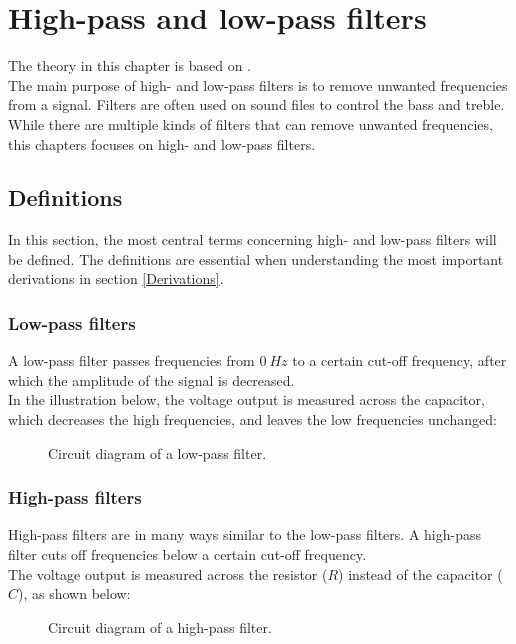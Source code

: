 \chapter{High-pass and low-pass filters} \label{chap:high_low}
The theory in this chapter is based on \cite{bcircuit}\cite{bcircuit5}.\\
The main purpose of high- and low-pass filters is to remove unwanted frequencies from a signal. Filters are often used on sound files to control the bass and treble. While there are multiple kinds of filters that can remove unwanted frequencies, this chapters focuses on high- and low-pass filters.

\section{Definitions}
In this section, the most central terms concerning high- and low-pass filters will be defined. The definitions are essential when understanding the most important derivations in section \ref{Derivations}.

\subsection{Low-pass filters}
A low-pass filter passes frequencies from  $0~Hz$ to a certain cut-off frequency, after which the amplitude of the signal is decreased.  
\\
In the illustration below, the voltage output is measured across the capacitor, which decreases the high frequencies, and leaves the low frequencies unchanged:
\\
\begin{figure}[H]
	
	\caption{Circuit diagram of a low-pass filter.} \label{lp:diagram}
\end{figure} 
\subsection{High-pass filters}
High-pass filters are in many ways similar to the low-pass filters. A high-pass filter cuts off frequencies below a certain cut-off frequency. \\
The voltage output is measured across the resistor ($R$) instead of the capacitor ($C$), as shown below:
\begin{figure}[H]
	
	\caption{Circuit diagram of a high-pass filter.}
	\label{hp:diagram}
\end{figure} 


